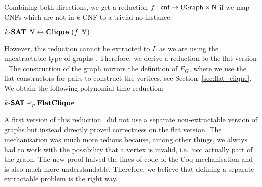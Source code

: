 Combining both directions, we get a reduction $f : \textsf{cnf} \rightarrow \textsf{UGraph} \times \mathsf{N}$ if we map CNFs which are not in $k$-CNF to a trivial no-instance.
\begin{theorem}
  $\text{$k$-\textbf{SAT}{}}~N \leftrightarrow \textbf{Clique}{}~(f~N)$
\end{theorem}

However, this reduction cannot be extracted to $L$ as we are using the unextractable type of graphs \UGraph. 
Therefore, we derive a reduction to the flat version \FlatClique{}. The construction of the graph mirrors the definition of $E_G$, where we use the flat constructors for pairs to construct the vertices, see Section~\ref{sec:flat_clique}. 
We obtain the following polynomial-time reduction:
\begin{theorem}
  $\textsf{$k$-\textbf{SAT}{}} \prec_p{} \textbf{FlatClique}{}$
\end{theorem}

\begin{remark}
  A first version of this reduction~\cite{memo_clique} did not use a separate non-extractable version of graphs but instead directly proved correctness on the flat version. 
  The mechanisation was much more tedious because, among other things, we always had to work with the possibility that a vertex is invalid, i.e.\ not actually part of the graph. 
  The new proof halved the lines of code of the Coq mechanisation and is also much more understandable. Therefore, we believe that defining a separate extractable problem is the right way.
\end{remark}

